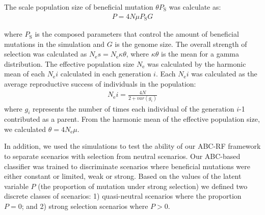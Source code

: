 \documentclass[a4paper, 12pt]{article}
\begin{document}
The scale population size of beneficial mutation $\theta P_{\mathrm{S}}$ was calculate as: 
\begin{gather*}
    P = 4 N \mu P_{\mathrm{S}} G
\end{gather*}

where $P_{\mathrm{S}}$ is the composed parameters that control the amount of beneficial mutations in the simulation and $G$ is the genome size. The overall strength of selection was calculated as $N_{\mathrm{e}}s = N_{\mathrm{e}}\kappa\theta$, where $\kappa\theta$ is the mean for a gamma distribution. The effective population size $N_{\mathrm{e}}$ was calculated by the harmonic mean of each $N_{\mathrm{e}}i$ calculated in each generation $i$. Each $N_{\mathrm{e}}i$ was calculated as the average reproductive success of individuals in the population:
\begin{gather*}
    N_{\mathrm{e}}i = \frac{4N}{2+var(g_{i})} 
\end{gather*}
where $g_{i}$ represents the number of times each individual of the generation {$i$-1} contributed as a parent. From the harmonic mean of the effective population size, we calculated $\theta = 4N_{\mathrm{e}}\mu$.    

In addition, we used the simulations to test the ability of our ABC-RF framework to separate scenarios with selection from neutral scenarios. Our ABC-based classifier was trained to discriminate scenarios where beneficial mutations were either constant or limited, weak or strong. Based on the values of the latent variable $P$ (the proportion of mutation under strong selection) we defined two discrete classes of scenarios: 1) quasi-neutral scenarios where the proportion $P=0$; and 2) strong selection scenarios where $P > 0$.
\end{document}
